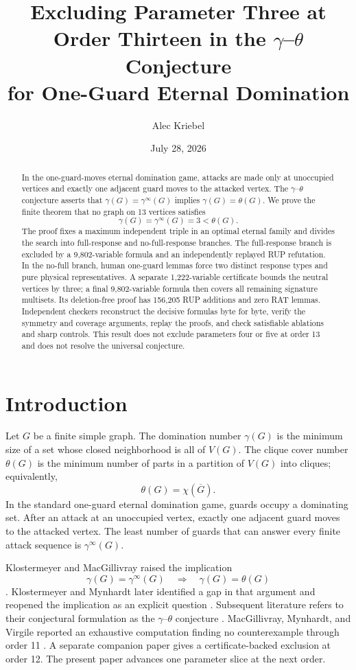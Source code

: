 \documentclass[11pt]{article}
\title{Excluding Parameter Three at Order Thirteen in the
\texorpdfstring{$\gamma$--$\theta$}{gamma--theta} Conjecture\\
for One-Guard Eternal Domination}
\author{Alec Kriebel}
\date{July 28, 2026}
\theoremstyle{definition}
\theoremstyle{remark}
\newcommand{\gaminf}{\gamma^{\infty}}
\newcommand{\V}{V}
\begin{document}
\maketitle

\begin{abstract}
In the one-guard-moves eternal domination game, attacks are made only at
unoccupied vertices and exactly one adjacent guard moves to the attacked
vertex.  The \(\gamma\)--\(\theta\) conjecture asserts that
\(\gamma(G)=\gaminf(G)\) implies \(\gamma(G)=\theta(G)\).
We prove the finite theorem that no graph on 13 vertices satisfies
\[
  \gamma(G)=\gaminf(G)=3<\theta(G).
\]
The proof fixes a maximum independent triple in an optimal eternal family
and divides the search into full-response and no-full-response branches.
The full-response branch is excluded by a 9,802-variable formula and an
independently replayed RUP refutation.  In the no-full branch, human
one-guard lemmas force two distinct response types and pure physical
representatives.  A separate 1,222-variable certificate bounds the neutral
vertices by three; a final 9,802-variable formula then covers all remaining
signature multisets.  Its deletion-free proof has 156,205 RUP additions and
zero RAT lemmas.  Independent checkers reconstruct the decisive formulas
byte for byte, verify the symmetry and coverage arguments, replay the
proofs, and check satisfiable ablations and sharp controls.  This result
does not exclude parameters four or five at order 13 and does not resolve
the universal conjecture.
\end{abstract}

\section{Introduction}\label{sec:intro}

Let \(G\) be a finite simple graph.  The domination number \(\gamma(G)\)
is the minimum size of a set whose closed neighborhood is all of
\(\V(G)\).  The clique cover number \(\theta(G)\) is the minimum number of
parts in a partition of \(\V(G)\) into cliques; equivalently,
\[
  \theta(G)=\chi(\overline G).
\tag{1.1}
\]
In the standard one-guard eternal domination game, guards occupy a
dominating set.  After an attack at an unoccupied vertex, exactly one
adjacent guard moves to the attacked vertex.  The least number of guards
that can answer every finite attack sequence is \(\gaminf(G)\).

Klostermeyer and MacGillivray raised the implication
\[
  \gamma(G)=\gaminf(G)
  \quad\Longrightarrow\quad
  \gamma(G)=\theta(G)
\tag{1.2}
\]
	\cite{KlostermeyerMacGillivray2009}.  Klostermeyer and Mynhardt later
	identified a gap in that argument and reopened the implication as an
	explicit question \cite{KlostermeyerMynhardt2015}.  Subsequent literature
	refers to their conjectural formulation as the
	\(\gamma\)--\(\theta\) conjecture
	\cite{MacGillivrayMynhardtVirgile2022}.  MacGillivray, Mynhardt, and Virgile
reported an exhaustive computation finding no counterexample through
order 11 \cite{MacGillivrayMynhardtVirgile2022}.  A separate companion
paper gives a certificate-backed exclusion at order 12.  The present paper
advances one parameter slice at the next order.
\end{document}
